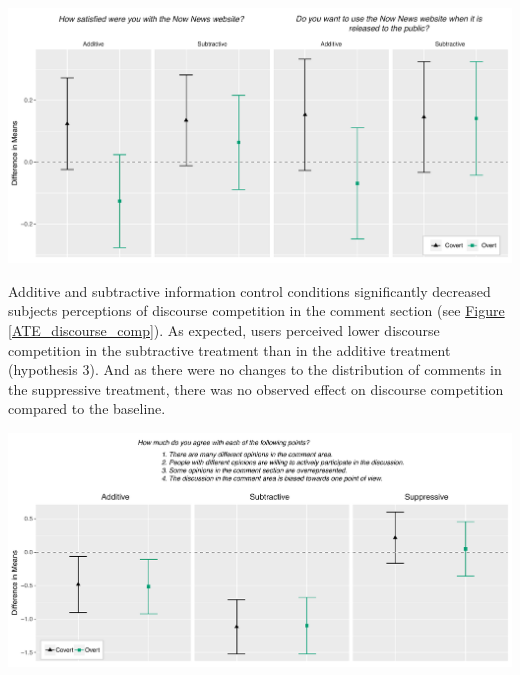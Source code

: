 \documentclass[11pt]{article}
\begin{document}
\begin{minipage}{\linewidth}
    \vspace{3em}
    \begin{center}
        \includegraphics[width=.9\textwidth]{figures/raw_ux.pdf}\\
        \label{ATE_ux}
    \end{center}
    \vspace{1em}
\end{minipage}

Additive and subtractive information control conditions significantly decreased subjects perceptions of discourse competition in the comment section (see \hyperref[ATE_discourse_comp]{Figure \ref*{ATE_discourse_comp}}). As expected, users perceived lower discourse competition in the subtractive treatment than in the additive treatment (hypothesis 3). And as there were no changes to the distribution of comments in the suppressive treatment, there was no observed effect on discourse competition compared to the baseline.

\begin{minipage}{\linewidth}
    \begin{center}
        \includegraphics[width=.9\textwidth]{figures/ATE_discourse_comp.pdf}\\
        \label{ATE_discourse_comp}
    \end{center}
    \vspace{.5em}
\end{minipage}
\end{document}
